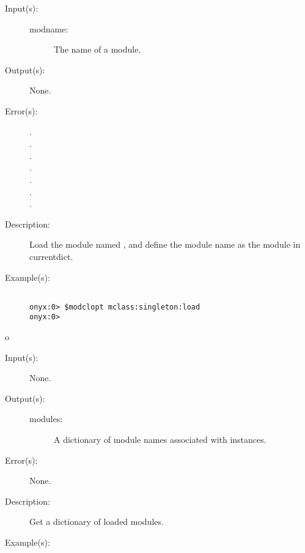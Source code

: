 \begin{description}
\label{mclass:load}
\item[{\onyxop{modname}{load}{--}}: ]
	\begin{description}\item[]
	\item[Input(s): ]
		\begin{description}\item[]
		\item[modname: ]
			The name of a module.
		\end{description}
	\item[Output(s): ] None.
	\item[Error(s): ]
		\begin{description}\item[]
		\item[.]
		\item[.]
		\item[.]
		\item[.]
		\item[.]
		\item[.]
		\item[.]
		\end{description}
	\item[Description: ]
		Load the module named , and define the module
		name as the module in currentdict.
	\item[Example(s): ]\begin{verbatim}

onyx:0> $modclopt mclass:singleton:load
onyx:0> 
		\end{verbatim}
	\end{description}
\label{mclass:modules}
o\item[{\onyxop{--}{modules}{modules}}: ]
	\begin{description}\item[]
	\item[Input(s): ] None.
	\item[Output(s): ]
		\begin{description}\item[]
		\item[modules: ]
			A dictionary of module names associated with
			 instances.
		\end{description}
	\item[Error(s): ] None.
	\item[Description: ]
		Get a dictionary of loaded modules.
	\item[Example(s): ]\begin{verbatim}


\end{verbatim}
\end{description}
\end{description}
